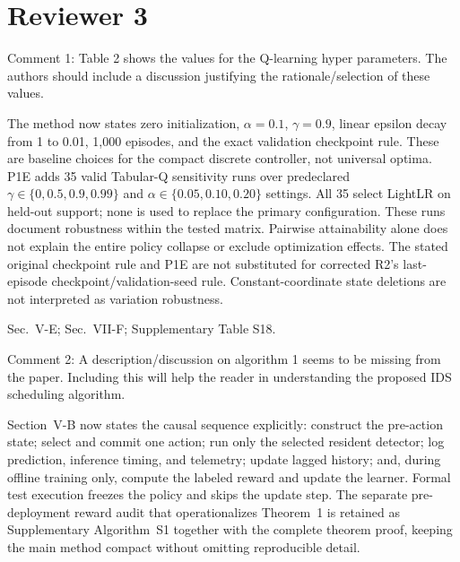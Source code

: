\documentclass[10pt,a4paper]{article}
\begin{document}
\section*{Reviewer 3}

\begin{rcommentbox}
Comment 1: Table 2 shows the values for the Q-learning hyper parameters. The authors should include a discussion justifying the rationale/selection of these values.
\end{rcommentbox}

\begin{authorresponsebox}
The method now states zero initialization, $\alpha=0.1$, $\gamma=0.9$, linear epsilon decay from 1 to 0.01, 1{,}000 episodes, and the exact validation checkpoint rule. These are baseline choices for the compact discrete controller, not universal optima. P1E adds 35 valid Tabular-Q sensitivity runs over predeclared $\gamma\in\{0, 0.5, 0.9, 0.99\}$ and $\alpha\in\{0.05, 0.10, 0.20\}$ settings. All 35 select LightLR on held-out support; none is used to replace the primary configuration. These runs document robustness within the tested matrix. Pairwise attainability alone does not explain the entire policy collapse or exclude optimization effects. The stated original checkpoint rule and P1E are not substituted for corrected R2's last-episode checkpoint/validation-seed rule. Constant-coordinate state deletions are not interpreted as variation robustness.
\end{authorresponsebox}

\begin{wherebox}
Sec.~V-E; Sec.~VII-F; Supplementary Table S18.
\end{wherebox}

\begin{rcommentbox}
Comment 2: A description/discussion on algorithm 1 seems to be missing from the paper. Including this will help the reader in understanding the proposed IDS scheduling algorithm.
\end{rcommentbox}

\begin{authorresponsebox}
Section~V-B now states the causal sequence explicitly: construct the pre-action state; select and commit one action; run only the selected resident detector; log prediction, inference timing, and telemetry; update lagged history; and, during offline training only, compute the labeled reward and update the learner. Formal test execution freezes the policy and skips the update step. The separate pre-deployment reward audit that operationalizes Theorem~1 is retained as Supplementary Algorithm~S1 together with the complete theorem proof, keeping the main method compact without omitting reproducible detail.
\end{authorresponsebox}
\end{document}
